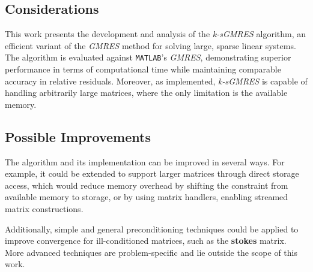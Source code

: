\subsection{Considerations}

This work presents the development and analysis of the \textit{k-sGMRES} algorithm, an efficient variant of the \textit{GMRES} method for solving large, sparse linear systems. The algorithm is evaluated against \lstinline{MATLAB}'s \textit{GMRES}, demonstrating superior performance in terms of computational time while maintaining comparable accuracy in relative residuals. Moreover, as implemented, \textit{k-sGMRES} is capable of handling arbitrarily large matrices, where the only limitation is the available memory.

\subsection{Possible Improvements}

The algorithm and its implementation can be improved in several ways. For example, it could be extended to support larger matrices through direct storage access, which would reduce memory overhead by shifting the constraint from available memory to storage, or by using matrix handlers, enabling streamed matrix constructions.

Additionally, simple and general preconditioning techniques could be applied to improve convergence for ill-conditioned matrices, such as the \textbf{stokes} matrix. More advanced techniques are problem-specific and lie outside the scope of this work.